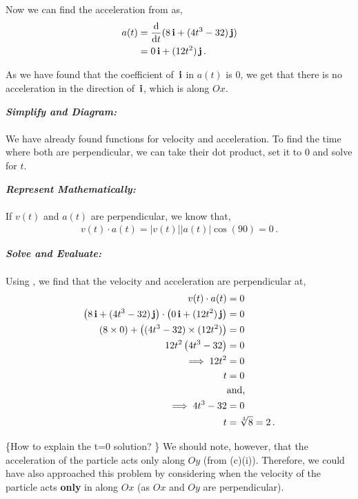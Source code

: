 \begin{subquestions}
\begin{subsubquestions}
Now we can find the acceleration from  as,
\begin{align}
	a(t) & = \frac{\mathrm{d}}{\mathrm{d}t}(8\,\mathbf{i}+(4t^3-32)\,\mathbf{j}) \nonumber \\
	     & = 0\,\mathbf{i} + (12t^2)\,\mathbf{j} \,.
\end{align}

As we have found that the coefficient of $\,\mathbf{i}$ in $a(t)$ is 0, we get that there is no acceleration in the direction of $\,\mathbf{i}$, which is along $Ox$. 


\subsubquestion

\textbf{\textit{Simplify and Diagram:}} \\ \\
We have already found functions for velocity and acceleration. To find the time where both are perpendicular, we can take their dot product, set it to 0 and solve for $t$.




\textbf{\textit{Represent Mathematically:}} \\ \\
If $v(t)$ and $a(t)$ are perpendicular, we know that,
\begin{align}
	v(t) \cdot a(t) = |v(t)||a(t)|\cos(90) = 0 \label{2009:q6:DotEqn} \,.
\end{align}




\textbf{\textit{Solve and Evaluate:}} \\ \\
Using , we find that the velocity and acceleration are perpendicular at,
\begin{align}
	v(t) \cdot a(t) & = 0 \nonumber \\
	\left(8\,\mathbf{i} + (4t^3-32)\,\mathbf{j}\right) \cdot \left(0\,\mathbf{i} + (12t^2)\,\mathbf{j} \right) & = 0 \nonumber \\
	\left(8 \times 0\right) + \left((4t^3-32) \times (12t^2)\right) & = 0 \nonumber \\
	12t^2\left(4t^3-32\right) & = 0 \nonumber \\
	\implies 12t^2 & = 0 \nonumber \\
	t & = 0 \\
	& \text{and,} \nonumber \\
	\implies 4t^3-32 & = 0 \nonumber \\
	t & = \sqrt[3]{8} = 2 \,.
\end{align}

\{How to explain the t=0 solution? \}
We should note, however, that the acceleration of the particle acts only along $Oy$ (from (c)(i)). Therefore, we could have also approached this problem by considering when the velocity of the particle acts \textbf{only} in along $Ox$ (as $Ox$ and $Oy$ are perpendicular).


\end{subsubquestions}
\end{subquestions}
